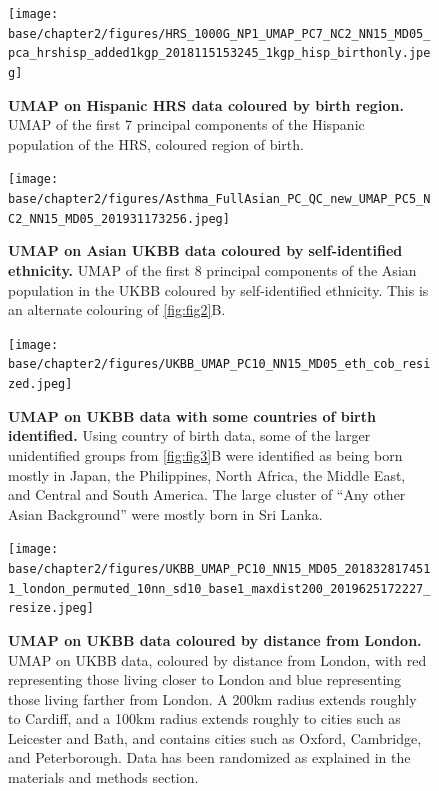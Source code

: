 \newpage

\begin{figure}[ht]
    \centering
    \texttt{[image: base/chapter2/figures/HRS\_1000G\_NP1\_UMAP\_PC7\_NC2\_NN15\_MD05\_pca\_hrshisp\_added1kgp\_2018115153245\_1kgp\_hisp\_birthonly.jpeg]}
    \caption[UMAP on Hispanic HRS data coloured by birth region]{\textbf{UMAP on Hispanic HRS data coloured by birth region.} UMAP of the first 7 principal components of the Hispanic population of the HRS, coloured region of birth.}
    \label{fig:supp_umap_hrs_hisp_birth}
\end{figure}

\newpage

\begin{figure}[ht]
    \centering
    \texttt{[image: base/chapter2/figures/Asthma\_FullAsian\_PC\_QC\_new\_UMAP\_PC5\_NC2\_NN15\_MD05\_201931173256.jpeg]}
    \caption[UMAP on Asian UKBB data coloured by self-identified ethnicity]{\textbf{UMAP on Asian UKBB data coloured by self-identified ethnicity.} UMAP of the first 8 principal components of the Asian population in the UKBB coloured by self-identified ethnicity. This is an alternate colouring of \ref{fig:fig2}B.}
    \label{fig:supp_umap_ukbb_asian_eth}
\end{figure}

\newpage

\begin{figure}[ht]
    \centering
    \texttt{[image: base/chapter2/figures/UKBB\_UMAP\_PC10\_NN15\_MD05\_eth\_cob\_resized.jpeg]}
    \caption[UMAP on UKBB data with some countries of birth identified]{\textbf{UMAP on UKBB data with some countries of birth identified.} Using country of birth data, some of the larger unidentified groups from \ref{fig:fig3}B were identified as being born mostly in Japan, the Philippines, North Africa, the Middle East, and Central and South America. The large cluster of ``Any other Asian Background'' were mostly born in Sri Lanka.}
    \label{fig:supp_ukbb_cob}
\end{figure}

\newpage

\begin{figure}[ht]
    \centering
    \texttt{[image: base/chapter2/figures/UKBB\_UMAP\_PC10\_NN15\_MD05\_2018328174511\_london\_permuted\_10nn\_sd10\_base1\_maxdist200\_2019625172227\_resize.jpeg]}
    \caption[UMAP on UKBB data coloured by distance from London]{\textbf{UMAP on UKBB data coloured by distance from London.} UMAP on UKBB data, coloured by distance from London, with red representing those living closer to London and blue representing those living farther from London. A 200km radius extends roughly to Cardiff, and a 100km radius extends roughly to cities such as Leicester and Bath, and contains cities such as Oxford, Cambridge, and Peterborough. Data has been randomized as explained in the materials and methods section.}
    \label{fig:supp_london_distance}
\end{figure}

